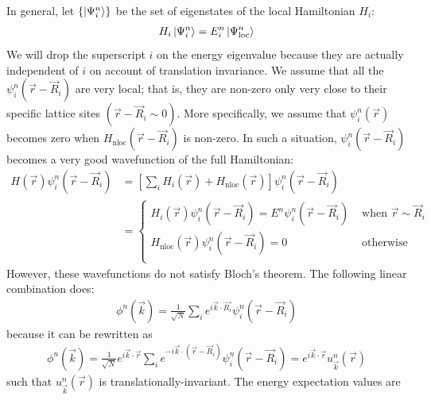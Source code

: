 \documentclass[12pt,onecolumn]{revtex4-2}
\begin{document}
In general, let $\left\{\ket{\Psi^n_i}\right\}$ be the set of eigenstates of the local Hamiltonian \(H_i\):
\begin{equation}\begin{aligned}
	H_i \ket{\Psi_i^n} = E^n_i\ket{\Psi_\text{loc}^n}
\end{aligned}\end{equation}
We will drop the superscript $i$ on the energy eigenvalue because they are actually independent of $i$ on account of translation invariance.
We assume that all the \(\psi_i^n(\vec r - \vec R_i)\) are very local; that is, they are non-zero only very close to their specific lattice sites \(\left( \vec r - \vec R_i \sim 0 \right) \). More specifically, we assume that \(\psi_i^n(\vec r)\) becomes zero when $H_\text{nloc}(\vec r - \vec R_i)$ is non-zero. In such a situation, \(\psi_i^n(\vec r - \vec R_i)\) becomes a very good wavefunction of the full Hamiltonian:
\begin{equation}\begin{aligned}
	H(\vec r)\psi_i^n(\vec r - \vec R_i) &= \left[\sum_i H_i(\vec r) + H_\text{nloc}(\vec r)\right] \psi_i^n(\vec r - \vec R_i)\\
					   &= \begin{cases}
						   H_i(\vec r)\psi_i^n(\vec r - \vec R_i) = E^n\psi_i^n(\vec r - \vec R_i) & \text{ when }\vec r \sim \vec R_i\\
						   H_\text{nloc}(\vec r) \psi_i^n(\vec r - \vec R_i) = 0 & \text{ otherwise }\\
	\end{cases}
\end{aligned}\end{equation}
However, these wavefunctions do not satisfy Bloch's theorem. The following linear combination does:
\begin{equation}\begin{aligned}
	\phi^n(\vec k) = \frac{1}{\sqrt N}\sum_{i}e^{i \vec{k}\cdot\vec{R_i}}\psi^n_i(\vec r - \vec R_i)
\end{aligned}\end{equation}
because it can be rewritten as
\begin{equation}\begin{aligned}
	\phi^n(\vec k) = \frac{1}{\sqrt N}e^{i \vec{k}\cdot\vec{r}}\sum_{i}e^{-i \vec{k}\cdot\left(\vec r-\vec R_i\right)}\psi^n_i(\vec r - \vec R_i) = e^{i \vec{k}\cdot\vec{r}} u^n_{\vec k}(\vec r)
\end{aligned}\end{equation}
such that \(u^n_{\vec k}(\vec r)\) is translationally-invariant. The energy expectation values are
\end{document}
